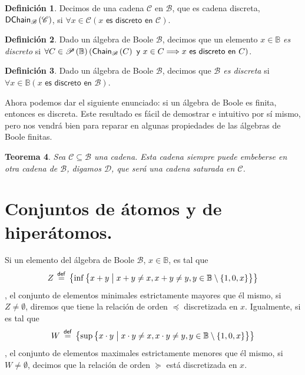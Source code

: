 \documentclass[final,12pt,a4paper,twoside,fleqn]{extbook}
\newcommand{\sthen}{\ensuremath{\Longrightarrow}}
\newcommand{\mathdef}{\ensuremath{\stackrel{\mathsf{def}}{{}={}}}}
\newcommand{\then}{\ensuremath{\sthen}}
\newcommand{\set}[1]{\ensuremath{\left\lbrace{#1}\right\rbrace}}
\newcommand {\setCompr}[2]{
	\ensuremath{
		\left\lbrace{ 
			#1 {\;\big{\vert}\;} #2
        }\right\rbrace
    }
}
\newcommand{\setB}{\ensuremath{\mathbb{B}}}
\newcommand{\algB}{\ensuremath{\mathscr{B}}}
\newtheorem{thm}{Teorema}[chapter]
\theoremstyle{definition}
\newtheorem{defn}[thm]{Definición}
\theoremstyle{remark}
\begin{document}
\begin{defn}
	Decimos de una cadena \(\mathscr{C}\) en \(\algB\), que es cadena
discreta, \(\EsCadenaDisc{\algB}{\mathscr{C}}\), si \(\forall x \in
\mathscr{C} \left(x \textsf{ es discreto en } \mathscr{C}\right)\).
\end{defn}



\begin{defn}
	Dado un álgebra de Boole \(\algB\), decimos que un elemento \(x \in
\setB\) \emph{ es discreto } si \(\forall C \in \PartesDe{\setB}
\left(\EsCadena{\algB}{C} \textsf{ y } x \in C \then x \textsf{ es discreto
en } C\right)\).
\end{defn}



\begin{defn}
	Dado un álgebra de Boole \(\algB\), decimos que \emph{ \(\algB\) es
discreta } si \(\forall x \in \setB \left(x \textsf{ es discreto en } \algB
\right)\).
\end{defn}




	Ahora podemos dar el siguiente enunciado: si un álgebra de Boole es
finita, entonces es discreta. Este resultado es fácil de demostrar e
intuitivo por sí mismo, pero nos vendrá bien para reparar en algunas
propiedades de las álgebras de Boole finitas.



\begin{thm}
	Sea \(\mathscr{C} \subseteq \algB\) una cadena. Esta cadena siempre puede
embeberse en otra cadena de \(\algB\), digamos \(\mathscr{D}\), que será una
cadena saturada en \(\mathscr{C}\).
\end{thm}



\section{Conjuntos de átomos y de hiperátomos.}

	Si un elemento del álgebra de Boole \(\algB\), \(x \in \setB\), es tal
que \[ Z \mathdef \set{\inf\setCompr{x+y}{ x+y \neq x , x+y \neq y , y \in
\setB\setminus\set{1,0,x}}}\], el conjunto de elementos minimales
estrictamente mayores que él mismo, si \(Z \neq \emptyset\), diremos que
tiene la relación de orden \(\preccurlyeq\) discretizada en \(x\).
Igualmente, si es tal que  \[ W \mathdef \set{\sup\setCompr{x \cdot y}{ x
\cdot y \neq x , x \cdot y \neq y , y \in \setB\setminus\set{1,0,x}}} \], el
conjunto de elementos maximales estrictamente menores que él mismo, si \( W
\neq \emptyset \), decimos que la relación de orden \(\succcurlyeq\) está
discretizada en \(x\).
\end{document}
